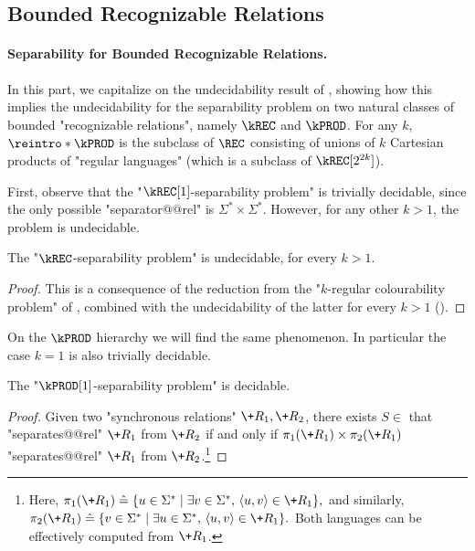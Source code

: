 \subsection{Bounded Recognizable Relations}

\paragraph*{Separability for Bounded Recognizable Relations.}

In this part, we capitalize on the undecidability result of , showing how this implies the undecidability for the separability problem on two natural classes of bounded "recognizable relations", namely $\kREC$ and $\kPROD$.
For any $k$, $\reintro*\kPROD$ is the subclass of $\REC$ consisting of unions of $k$ Cartesian products of "regular languages" (which is a subclass of $\kREC[2^{2k}]$).

First, observe that the "$\kREC[1]$-separability problem" is trivially decidable, since the only possible "separator@@rel" is $\Sigma^* \times \Sigma^*$. However, for any other $k>1$, the problem is undecidable.

\begin{corollary}
    The "$\kREC$-separability problem" is undecidable, for every $k>1$.
\end{corollary}

\begin{proof}
    This is a consequence of the reduction from the "$k$-regular colourability problem" of , combined with the undecidability of the latter for every $k>1$ ().
\end{proof}

On the $\kPROD$ hierarchy we will find the same phenomenon. In particular the case $k=1$ is also trivially decidable.

\begin{proposition}
    The "$\kPROD[1]$-separability problem" is decidable.
\end{proposition}
\begin{proof}
    Given two "synchronous relations" $\+R_1, \+R_2$, there exists $S \in $ \kPROD[1]
    that "separates@@rel" $\+R_1$ from $\+R_2$ if and only if $\pi_1(\+R_1)\times \pi_2(\+R_1)$
    "separates@@rel" $\+R_1$ from $\+R_2$.\footnote{Here,
    \(
        \pi_1(\+R_1) \defeq 
        \{u \in \Sigma^* \mid \exists v\in \Sigma^*,\,\tup{u,v} \in \+R_1\},
    \)
    and similarly,
    \(
        \pi_2(\+R_1) \defeq 
        \{v \in \Sigma^* \mid \exists u\in \Sigma^*,\,\tup{u,v} \in \+R_1\}.
    \)
    Both languages can be effectively computed from $\+R_1$.}
\end{proof}

